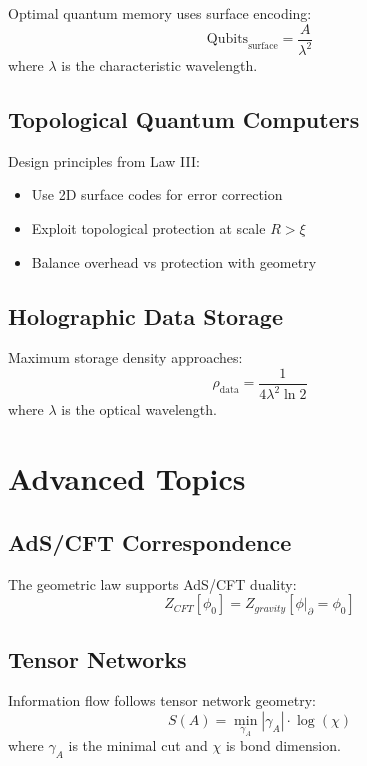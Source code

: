 \documentclass[11pt,a4paper]{article}
\theoremstyle{definition}
\begin{document}
Optimal quantum memory uses surface encoding:
\begin{equation}
\text{Qubits}_{\text{surface}} = \frac{A}{\lambda^2}
\end{equation}
where $\lambda$ is the characteristic wavelength.

\subsection{Topological Quantum Computers}

Design principles from Law III:
\begin{itemize}
\item Use 2D surface codes for error correction
\item Exploit topological protection at scale $R > \xi$
\item Balance overhead vs protection with geometry
\end{itemize}

\subsection{Holographic Data Storage}

Maximum storage density approaches:
\begin{equation}
\rho_{\text{data}} = \frac{1}{4\lambda^2 \ln 2}
\end{equation}
where $\lambda$ is the optical wavelength.

\section{Advanced Topics}

\subsection{AdS/CFT Correspondence}

The geometric law supports AdS/CFT duality:
\begin{equation}
Z_{CFT}[\phi_0] = Z_{gravity}[\phi|_{\partial} = \phi_0]
\end{equation}

\subsection{Tensor Networks}

Information flow follows tensor network geometry:
\begin{equation}
S(A) = \min_{\gamma_A} |\gamma_A| \cdot \log(\chi)
\end{equation}
where $\gamma_A$ is the minimal cut and $\chi$ is bond dimension.
\end{document}
